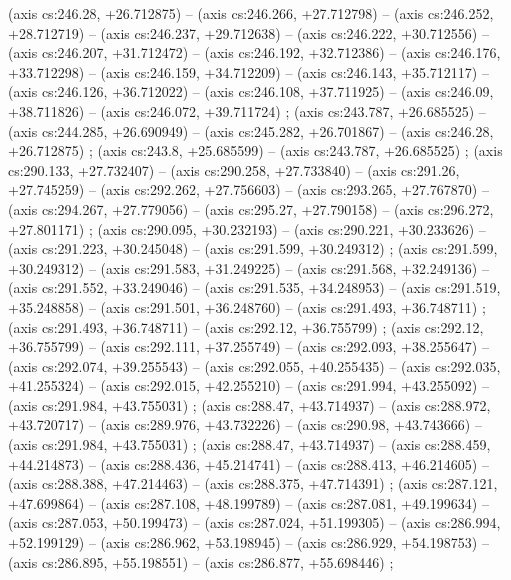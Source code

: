     (axis cs:246.28,    +26.712875) --  (axis cs:246.266,    +27.712798) --  (axis cs:246.252,    +28.712719) --  (axis cs:246.237,    +29.712638) --  (axis cs:246.222,    +30.712556) --  (axis cs:246.207,    +31.712472) --  (axis cs:246.192,    +32.712386) --  (axis cs:246.176,    +33.712298) --  (axis cs:246.159,    +34.712209) --  (axis cs:246.143,    +35.712117) --  (axis cs:246.126,    +36.712022) --  (axis cs:246.108,    +37.711925) --  (axis cs:246.09,    +38.711826) --  (axis cs:246.072,    +39.711724) ;
    (axis cs:243.787,    +26.685525) --  (axis cs:244.285,    +26.690949) --  (axis cs:245.282,    +26.701867) --  (axis cs:246.28,    +26.712875) ;
    (axis cs:243.8,    +25.685599) --  (axis cs:243.787,    +26.685525) ;
    (axis cs:290.133,    +27.732407) --  (axis cs:290.258,    +27.733840) --  (axis cs:291.26,    +27.745259) --  (axis cs:292.262,    +27.756603) --  (axis cs:293.265,    +27.767870) --  (axis cs:294.267,    +27.779056) --  (axis cs:295.27,    +27.790158) --  (axis cs:296.272,    +27.801171) ;
    (axis cs:290.095,    +30.232193) --  (axis cs:290.221,    +30.233626) --  (axis cs:291.223,    +30.245048) --  (axis cs:291.599,    +30.249312) ;
    (axis cs:291.599,    +30.249312) --  (axis cs:291.583,    +31.249225) --  (axis cs:291.568,    +32.249136) --  (axis cs:291.552,    +33.249046) --  (axis cs:291.535,    +34.248953) --  (axis cs:291.519,    +35.248858) --  (axis cs:291.501,    +36.248760) --  (axis cs:291.493,    +36.748711) ;
    (axis cs:291.493,    +36.748711) --  (axis cs:292.12,    +36.755799) ;
    (axis cs:292.12,    +36.755799) --  (axis cs:292.111,    +37.255749) --  (axis cs:292.093,    +38.255647) --  (axis cs:292.074,    +39.255543) --  (axis cs:292.055,    +40.255435) --  (axis cs:292.035,    +41.255324) --  (axis cs:292.015,    +42.255210) --  (axis cs:291.994,    +43.255092) --  (axis cs:291.984,    +43.755031) ;
    (axis cs:288.47,    +43.714937) --  (axis cs:288.972,    +43.720717) --  (axis cs:289.976,    +43.732226) --  (axis cs:290.98,    +43.743666) --  (axis cs:291.984,    +43.755031) ;
    (axis cs:288.47,    +43.714937) --  (axis cs:288.459,    +44.214873) --  (axis cs:288.436,    +45.214741) --  (axis cs:288.413,    +46.214605) --  (axis cs:288.388,    +47.214463) --  (axis cs:288.375,    +47.714391) ;
    (axis cs:287.121,    +47.699864) --  (axis cs:287.108,    +48.199789) --  (axis cs:287.081,    +49.199634) --  (axis cs:287.053,    +50.199473) --  (axis cs:287.024,    +51.199305) --  (axis cs:286.994,    +52.199129) --  (axis cs:286.962,    +53.198945) --  (axis cs:286.929,    +54.198753) --  (axis cs:286.895,    +55.198551) --  (axis cs:286.877,    +55.698446) ;
